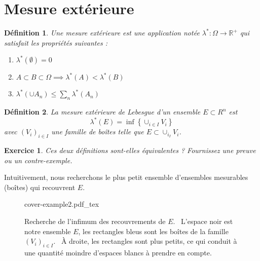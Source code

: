 \documentclass[a4paper]{article}
\newcommand{\incfig}[1]{%
    \def\svgwidth{\columnwidth}
    {#1.pdf_tex}
}
\newcommand{\R}{\mathbb{R}}
\newtheorem{definition}{Définition}[section]
\newtheorem{exercise}{Exercice}[section]
\begin{document}
\section{Mesure extérieure}%
% 
\label{sec:Outer measure}%
\begin{definition}
    Une mesure extérieure est une application notée $\lambda^*: \Omega \to \R^+$ qui satisfait les propriétés suivantes :
    \begin{enumerate}
        \item $\lambda^*(\emptyset) = 0$
        \item $A \subset B \subset \Omega \implies \lambda^*(A) < \lambda^*(B)$ 
        \item $\lambda^*(\cup A_n) \le \sum_n \lambda^*(A_n)$
    \end{enumerate}
\end{definition}%
\begin{definition}\label{defn:lebesgue-outer-measure}
    La mesure extérieure de Lebesgue d'un ensemble $E \subset R^n$ est 
    \[
        \lambda^*(E) = \inf \left\{ \cup_{i \in I} V_i \right\}
    \] 
    avec $(V_i)_{i \in I}$ une famille de boîtes telle que $E \subset \cup_{i_I} V_i$.
\end{definition}%
\begin{exercise}
   Ces deux définitions sont-elles équivalentes ? Fournissez une preuve ou un contre-exemple.
\end{exercise}%
Intuitivement, nous recherchons le plus petit ensemble d'ensembles mesurables (boîtes) qui recouvrent
$E$.%
\begin{figure}[H]
    \centering
    \incfig{cover-example2}
    \caption{Recherche de l'infimum des recouvrements de $E$. \
        L'espace noir est notre
        ensemble $E$, les rectangles bleus sont les boîtes de la famille $(V_i)_{i \in I}$. \
        À droite, les rectangles sont plus petits, ce qui conduit à une quantité moindre d'espaces blancs à prendre en compte.}
    \label{fig:cover-example2}
\end{figure}%
\end{document}
